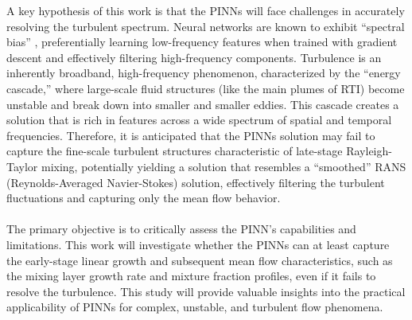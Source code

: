 \documentclass{homework}
\begin{document}
A key hypothesis of this work is that the PINNs will face challenges in accurately resolving the turbulent spectrum. Neural networks are known to exhibit ``spectral bias'' \cite{Rahaman2019,LUO2021}, preferentially learning low-frequency features when trained with gradient descent and effectively filtering high-frequency components. Turbulence is an inherently broadband, high-frequency phenomenon, characterized by the ``energy cascade,'' where large-scale fluid structures (like the main plumes of RTI) become unstable and break down into smaller and smaller eddies. This cascade creates a solution that is rich in features across a wide spectrum of spatial and temporal frequencies. Therefore, it is anticipated that the PINNs solution may fail to capture the fine-scale turbulent structures characteristic of late-stage Rayleigh-Taylor mixing, potentially yielding a solution that resembles a ``smoothed'' RANS (Reynolds-Averaged Navier-Stokes) solution, effectively filtering the turbulent fluctuations and capturing only the mean flow behavior.
\\ \\
The primary objective is to critically assess the PINN's capabilities and limitations. This work will investigate whether the PINNs can at least capture the early-stage linear growth and subsequent mean flow characteristics, such as the mixing layer growth rate and mixture fraction profiles, even if it fails to resolve the turbulence. This study will provide valuable insights into the practical applicability of PINNs for complex, unstable, and turbulent flow phenomena.
\end{document}
